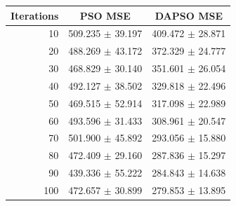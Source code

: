 \begin{tabular}{rcc}
\hline
Iterations & PSO MSE & DAPSO MSE \\
\hline
10 & 509.235 $\pm$ 39.197 & 409.472 $\pm$ 28.871 \\
20 & 488.269 $\pm$ 43.172 & 372.329 $\pm$ 24.777 \\
30 & 468.829 $\pm$ 30.140 & 351.601 $\pm$ 26.054 \\
40 & 492.127 $\pm$ 38.502 & 329.818 $\pm$ 22.496 \\
50 & 469.515 $\pm$ 52.914 & 317.098 $\pm$ 22.989 \\
60 & 493.596 $\pm$ 31.433 & 308.961 $\pm$ 20.547 \\
70 & 501.900 $\pm$ 45.892 & 293.056 $\pm$ 15.880 \\
80 & 472.409 $\pm$ 29.160 & 287.836 $\pm$ 15.297 \\
90 & 439.336 $\pm$ 55.222 & 284.843 $\pm$ 14.638 \\
100 & 472.657 $\pm$ 30.899 & 279.853 $\pm$ 13.895 \\
\hline
\end{tabular}